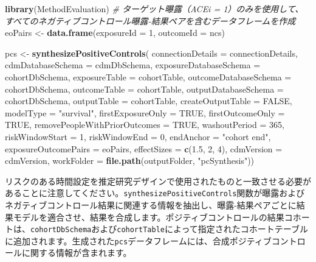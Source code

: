 \documentclass[
  11pt]{book}
\newenvironment{Shaded}{\begin{snugshade}}{\end{snugshade}}
\newcommand{\AttributeTok}[1]{\textcolor[rgb]{0.13,0.29,0.53}{#1}}
\newcommand{\CommentTok}[1]{\textcolor[rgb]{0.56,0.35,0.01}{\textit{#1}}}
\newcommand{\ConstantTok}[1]{\textcolor[rgb]{0.56,0.35,0.01}{#1}}
\newcommand{\DecValTok}[1]{\textcolor[rgb]{0.00,0.00,0.81}{#1}}
\newcommand{\FloatTok}[1]{\textcolor[rgb]{0.00,0.00,0.81}{#1}}
\newcommand{\FunctionTok}[1]{\textcolor[rgb]{0.13,0.29,0.53}{\textbf{#1}}}
\newcommand{\NormalTok}[1]{#1}
\newcommand{\OtherTok}[1]{\textcolor[rgb]{0.56,0.35,0.01}{#1}}
\newcommand{\StringTok}[1]{\textcolor[rgb]{0.31,0.60,0.02}{#1}}
\theoremstyle{definition}
\theoremstyle{definition}
\theoremstyle{definition}
\theoremstyle{definition}
\theoremstyle{remark}
\begin{document}
\begin{Shaded}
\begin{Highlighting}[]
\FunctionTok{library}\NormalTok{(MethodEvaluation)}
\CommentTok{\# ターゲット曝露（ACEi = 1）のみを使用して、すべてのネガティブコントロール曝露{-}結果ペアを含むデータフレームを作成}
\NormalTok{eoPairs }\OtherTok{\textless{}{-}} \FunctionTok{data.frame}\NormalTok{(}\AttributeTok{exposureId =} \DecValTok{1}\NormalTok{,}
                      \AttributeTok{outcomeId =}\NormalTok{ ncs)}

\NormalTok{pcs }\OtherTok{\textless{}{-}} \FunctionTok{synthesizePositiveControls}\NormalTok{(}
  \AttributeTok{connectionDetails =}\NormalTok{ connectionDetails,}
  \AttributeTok{cdmDatabaseSchema =}\NormalTok{ cdmDbSchema,}
  \AttributeTok{exposureDatabaseSchema =}\NormalTok{ cohortDbSchema,}
  \AttributeTok{exposureTable =}\NormalTok{ cohortTable,}
  \AttributeTok{outcomeDatabaseSchema =}\NormalTok{ cohortDbSchema,}
  \AttributeTok{outcomeTable =}\NormalTok{ cohortTable,}
  \AttributeTok{outputDatabaseSchema =}\NormalTok{ cohortDbSchema,}
  \AttributeTok{outputTable =}\NormalTok{ cohortTable,}
  \AttributeTok{createOutputTable =} \ConstantTok{FALSE}\NormalTok{,}
  \AttributeTok{modelType =} \StringTok{"survival"}\NormalTok{,}
  \AttributeTok{firstExposureOnly =} \ConstantTok{TRUE}\NormalTok{,}
  \AttributeTok{firstOutcomeOnly =} \ConstantTok{TRUE}\NormalTok{,}
  \AttributeTok{removePeopleWithPriorOutcomes =} \ConstantTok{TRUE}\NormalTok{,}
  \AttributeTok{washoutPeriod =} \DecValTok{365}\NormalTok{,}
  \AttributeTok{riskWindowStart =} \DecValTok{1}\NormalTok{,}
  \AttributeTok{riskWindowEnd =} \DecValTok{0}\NormalTok{,}
  \AttributeTok{endAnchor =} \StringTok{"cohort end"}\NormalTok{,}
  \AttributeTok{exposureOutcomePairs =}\NormalTok{ eoPairs,}
  \AttributeTok{effectSizes =} \FunctionTok{c}\NormalTok{(}\FloatTok{1.5}\NormalTok{, }\DecValTok{2}\NormalTok{, }\DecValTok{4}\NormalTok{),}
  \AttributeTok{cdmVersion =}\NormalTok{ cdmVersion,}
  \AttributeTok{workFolder =} \FunctionTok{file.path}\NormalTok{(outputFolder, }\StringTok{"pcSynthesis"}\NormalTok{))}
\end{Highlighting}
\end{Shaded}

リスクのある時間設定を推定研究デザインで使用されたものと一致させる必要があることに注意してください。\texttt{synthesizePositiveControls}関数が曝露およびネガティブコントロール結果に関連する情報を抽出し、曝露-結果ペアごとに結果モデルを適合させ、結果を合成します。ポジティブコントロールの結果コホートは、\texttt{cohortDbSchema}および\texttt{cohortTable}によって指定されたコホートテーブルに追加されます。生成された\texttt{pcs}データフレームには、合成ポジティブコントロールに関する情報が含まれます。
\end{document}
